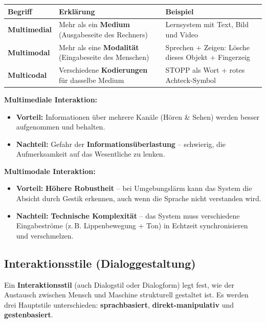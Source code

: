 \documentclass[12pt, a4paper]{article}
\begin{document}
\begin{center}
\begin{tabular}{p{2.8cm} p{5.5cm} p{5cm}}
\hline
\textbf{Begriff} & \textbf{Erklärung} & \textbf{Beispiel} \\
\hline
\textbf{Multimedial} & Mehr als ein \textbf{Medium} (Ausgabeseite des Rechners) &
  Lernsystem mit Text, Bild und Video \\[4pt]
\textbf{Multimodal} & Mehr als eine \textbf{Modalität} (Eingabeseite des Menschen) &
  Sprechen + Zeigen: \glqq{}Lösche dieses Objekt\grqq{} + Fingerzeig \\[4pt]
\textbf{Multicodal} & Verschiedene \textbf{Kodierungen} für dasselbe Medium &
  \glqq{}STOPP\grqq{} als Wort + rotes Achteck-Symbol \\
\hline
\end{tabular}
\end{center}

\textbf{Multimediale Interaktion:}
\begin{itemize}
  \item \textbf{Vorteil:} Informationen über mehrere Kanäle (Hören \& Sehen) werden
        besser aufgenommen und behalten.
  \item \textbf{Nachteil:} Gefahr der \textbf{Informationsüberlastung} -- schwierig,
        die Aufmerksamkeit auf das Wesentliche zu lenken.
\end{itemize}

\textbf{Multimodale Interaktion:}
\begin{itemize}
  \item \textbf{Vorteil:} \textbf{Höhere Robustheit} -- bei Umgebungslärm kann das
        System die Absicht durch Gestik erkennen, auch wenn die Sprache nicht
        verstanden wird.
  \item \textbf{Nachteil:} \textbf{Technische Komplexität} -- das System muss
        verschiedene Eingabeströme (z.\,B. Lippenbewegung + Ton) in Echtzeit
        synchronisieren und verschmelzen.
\end{itemize}

\subsection{Interaktionsstile (Dialoggestaltung)}

Ein \textbf{Interaktionsstil} (auch Dialogstil oder Dialogform) legt fest, wie der
Austausch zwischen Mensch und Maschine strukturell gestaltet ist. Es werden drei
Hauptstile unterschieden: \textbf{sprachbasiert}, \textbf{direkt-manipulativ} und
\textbf{gestenbasiert}.
\end{document}
